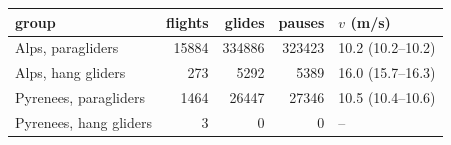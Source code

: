 \begin{tabular}{lrrrl}
\toprule
group & flights & glides & pauses & $v$ (m/s) \\
\midrule
Alps, paragliders & 15884 & 334886 & 323423 & 10.2 (10.2--10.2) \\
Alps, hang gliders & 273 & 5292 & 5389 & 16.0 (15.7--16.3) \\
Pyrenees, paragliders & 1464 & 26447 & 27346 & 10.5 (10.4--10.6) \\
Pyrenees, hang gliders & 3 & 0 & 0 & -- \\
\bottomrule
\end{tabular}
